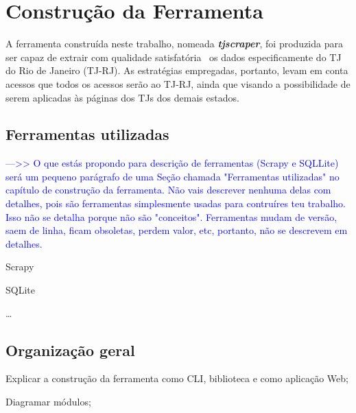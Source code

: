 \chapter{Construção da Ferramenta~\label{chp:construção-da-ferramenta}}

A ferramenta construída neste trabalho, nomeada \textit{\textbf{tjscraper}},
foi produzida para ser capaz de extrair com qualidade
satisfatória~ os dados especificamente do TJ do Rio de
Janeiro (TJ-RJ). As estratégias empregadas, portanto, levam em conta acessos
que todos os acessos serão ao TJ-RJ, ainda que visando a possibilidade de serem
aplicadas às páginas dos TJs dos demais estados.

\section{Ferramentas utilizadas~\label{section:ferramentas-utilizadas}}

\textcolor{blue}{--->> O que estás propondo para descrição de ferramentas
(Scrapy e SQLLite) será um pequeno parágrafo de uma Seção chamada "Ferramentas
utilizadas" no capítulo de construção da ferramenta. Não vais descrever nenhuma
delas com detalhes, pois são ferramentas simplesmente usadas para contruíres
teu trabalho. Isso não se detalha porque não são "conceitos". Ferramentas mudam
de versão, saem de linha, ficam obsoletas, perdem valor, etc, portanto, não se
descrevem em detalhes.}

\begin{todolist}
    \item Scrapy
    \item SQLite
    \item \ldots
\end{todolist}

\section{Organização geral}

\begin{todolist}
    \item Explicar a construção da ferramenta como CLI, biblioteca e como
          aplicação Web;
    \item Diagramar módulos;
\end{todolist}


